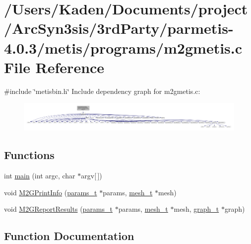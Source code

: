 \hypertarget{a00317}{}\section{/\+Users/\+Kaden/\+Documents/project/\+Arc\+Syn3sis/3rd\+Party/parmetis-\/4.0.3/metis/programs/m2gmetis.c File Reference}
\label{a00317}
{\ttfamily \#include \char`\"{}metisbin.\+h\char`\"{}}\newline
Include dependency graph for m2gmetis.\+c\+:\nopagebreak
\begin{figure}[H]
\begin{center}
\leavevmode
\includegraphics[width=350pt]{a00318}
\end{center}
\end{figure}
\subsection*{Functions}
\begin{DoxyCompactItemize}
\item 
int \hyperlink{a00317_a0ddf1224851353fc92bfbff6f499fa97}{main} (int argc, char $\ast$argv\mbox{[}$\,$\mbox{]})
\item 
void \hyperlink{a00317_ac1de26132f220c8648448493e1c701c3}{M2\+G\+Print\+Info} (\hyperlink{a00706}{params\+\_\+t} $\ast$params, \hyperlink{a00738}{mesh\+\_\+t} $\ast$mesh)
\item 
void \hyperlink{a00317_a1830d2cc04f766d0cf9f16cbf81d0a4b}{M2\+G\+Report\+Results} (\hyperlink{a00706}{params\+\_\+t} $\ast$params, \hyperlink{a00738}{mesh\+\_\+t} $\ast$mesh, \hyperlink{a00734}{graph\+\_\+t} $\ast$graph)
\end{DoxyCompactItemize}


\subsection{Function Documentation}
\mbox{\label{a00317_ac1de26132f220c8648448493e1c701c3}} 
